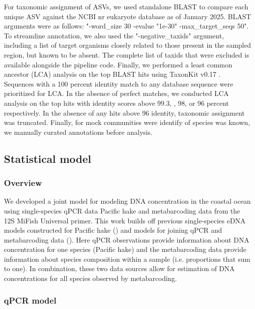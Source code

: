 \documentclass{article}
\begin{document}
For taxonomic assignment of ASVs, we used standalone BLAST \cite{altschul1990} to compare each unique ASV against the NCBI nr eukaryote database as of January 2025. BLAST arguments were as follows: "-word\_size 30 -evalue "1e-30" -max\_target\_seqs 50". To streamline annotation, we also used the "-negative\_taxids" argument, including a list of target organisms closely related to those present in the sampled region, but known to be absent. The complete list of taxids that were excluded is available alongside the pipeline code. Finally, we performed a least common ancestor (LCA) analysis on the top BLAST hits using TaxonKit v0.17 \cite{shen2021}. Sequences with a 100 percent identity match to any database sequence were prioritized for LCA. In the absence of perfect matches, we conducted LCA analysis on the top hits with identity scores above 99.3, , 98, or 96 percent respectively. In the absence of any hits above 96 identity, taxonomic assignment was truncated. Finally, for mock communities were identify of species was known, we manually curated annotations before analysis. 

\subsection*{Statistical model}

\subsubsection*{Overview}

We developed a joint model for modeling DNA concentration in the coastal ocean using single-species qPCR data Pacific hake and metabarcoding data from the 12S MiFish Universal primer. This work builds off previous single-species eDNA models constructed for Pacific hake (\cite{shelton2022}) and models for joining qPCR and metabarcoding data (\cite{guri2024a}). Here qPCR observations provide information about DNA concentration for one species (Pacific hake) and the metabarcoding data provide information about species composition within a sample (i.e. proportions that sum to one).  In combination, these two data sources allow for estimation of DNA concentrations for all species observed by metabarcoding.

\subsubsection*{qPCR model}
\end{document}

